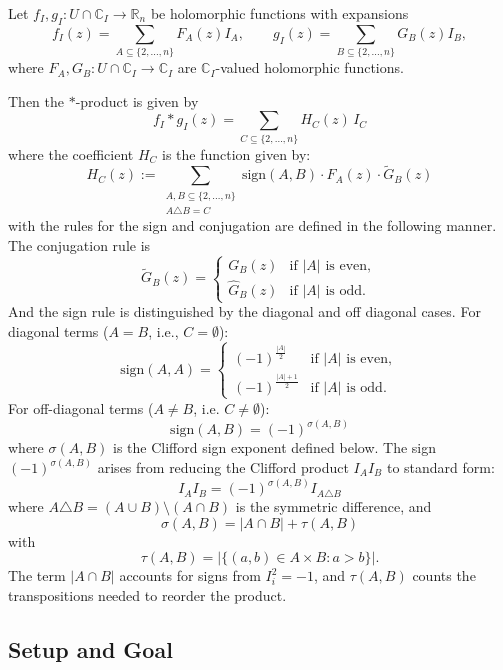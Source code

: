 \documentclass[11pt]{amsart}
\begin{document}
Let $f_I, g_I : U \cap \mathbb{C}_I \to \mathbb{R}_n$ be holomorphic functions with expansions
\[
f_I(z) = \sum_{A \subseteq \{2,\ldots,n\}} F_A(z) I_A, \qquad g_I(z) = \sum_{B \subseteq \{2,\ldots,n\}} G_B(z) I_B,
\]
where $F_A, G_B : U \cap \mathbb{C}_I \to \mathbb{C}_I$ are $\mathbb{C}_I$-valued holomorphic functions.

Then the $*$-product is given by
\begin{equation}
\label{eq:newproduct}
f_I * g_I(z) = \sum_{C \subseteq \{2,\ldots,n\}} H_C(z) \, I_C
\end{equation}
where the coefficient $H_C$ is the function given by:
\begin{equation}
\label{eq:newcoefficients}
H_C(z) := \sum_{\substack{A, B \subseteq \{2,\ldots,n\} \\ A \triangle B = C}} \text{sign}(A,B) \cdot F_A(z) \cdot \tilde{G}_B(z)
\end{equation}
with the rules for the sign and conjugation are defined in the following manner.  The conjugation rule is
\[
\tilde{G}_B(z) =
\begin{cases}
G_B(z) & \text{if } |A| \text{ is even}, \\[4pt]
\hat{G}_B(z) & \text{if } |A| \text{ is odd}.
\end{cases}
\]
And the sign rule is distinguished by the diagonal and off diagonal cases.  For diagonal terms ($A = B$, i.e., $C = \emptyset$):
\[
\text{sign}(A, A) =
\begin{cases}
(-1)^{\frac{|A|}{2}} & \text{if } |A| \text{ is even}, \\[4pt]
(-1)^{\frac{|A|+1}{2}} & \text{if } |A| \text{ is odd}.
\end{cases}
\]
For off-diagonal terms ($A \neq B$, i.e. $C\neq \emptyset$):
\[
\text{sign}(A, B) = (-1)^{\sigma(A,B)}
\]
where $\sigma(A,B)$ is the Clifford sign exponent defined below.  The sign $(-1)^{\sigma(A,B)}$ arises from reducing the Clifford product $I_A I_B$ to standard form:
\[
I_A I_B = (-1)^{\sigma(A,B)} I_{A \triangle B}
\]
where $A \triangle B = (A \cup B) \setminus (A \cap B)$ is the symmetric difference, and
\[
\sigma(A, B) = |A \cap B| + \tau(A, B)
\]
with
\[
\tau(A, B) = \bigl|\{(a, b) \in A \times B : a > b\}\bigr|.
\]
The term $|A \cap B|$ accounts for signs from $I_i^2 = -1$, and $\tau(A,B)$ counts the transpositions needed to reorder the product.

\subsection{Setup and Goal}
\end{document}
